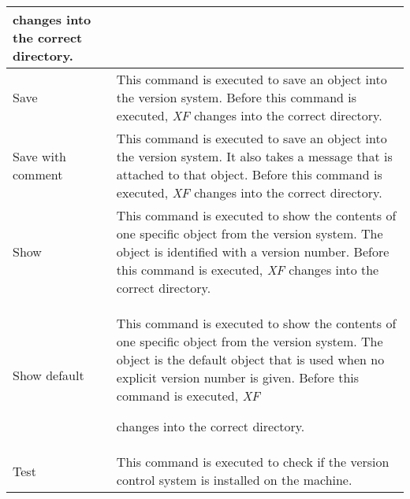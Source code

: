 {\begin{supertabular}{|l|p{7.5cm}|}
                          changes into the correct
                          directory.\\  \hline
Save                    & This command is executed to
                          save an object into the version
                          system. Before this command is
                          executed, {\em XF }
 changes into the
                          correct directory.\\  \hline
Save with comment       & This command is executed to
                          save an object into the version
                          system. It also takes a message
                          that is attached to that object.
                          Before this command is executed,
                          {\em XF }
 changes into the correct
                          directory.\\  \hline
Show                    & This command is executed to
                          show the contents of one specific
                          object from the version system.
                          The object is identified with a
                          version number. Before this
                          command is executed, {\em XF }
 changes
                          into the correct directory.\\  \hline
Show default            & This command is executed to
                          show the contents of one specific
                          object from the version system.
                          The object is the default object
                          that is used when no explicit
                          version number is given. Before
                          this command is executed, {\em XF }

                          changes into the correct
                          directory.\\  \hline
Test                    & This command is executed to
                          check if the version control
                          system is installed on the
                          machine.\\ 
\end{supertabular}
}

{\newpage
\clearpage
\samepage \begin{figure}[hbt]
  \centerline{
  \epsfysize=9cm
  }
  
  \label{fig:The procedure XFProcOptionsWindow}
\end{figure}
}

